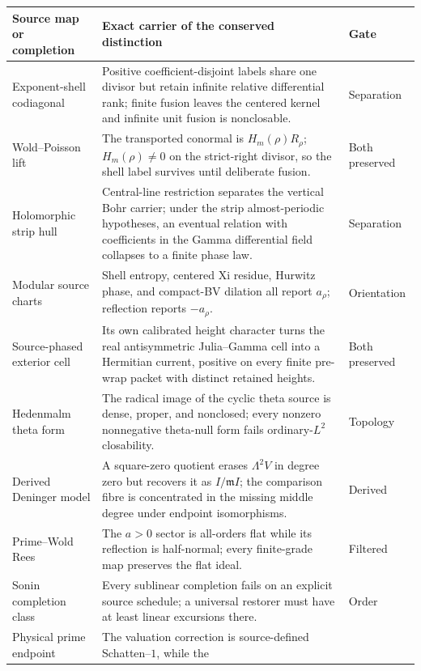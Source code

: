 \documentclass[11pt]{article}
\theoremstyle{definition}
\theoremstyle{remark}
\begin{document}
\begin{table}[ht]
\centering
\footnotesize
\begin{tabular}{@{}>{\raggedright\arraybackslash}p{}
  >{\raggedright\arraybackslash}p{}
  >{\raggedright\arraybackslash}p{}@{}}
\toprule
Source map or completion & Exact carrier of the conserved distinction & Gate\\
\midrule
Exponent-shell codiagonal & Positive coefficient-disjoint labels share one divisor but retain
infinite relative differential rank; finite fusion leaves the centered kernel and infinite unit
fusion is nonclosable. & Separation\\
Wold--Poisson lift & The transported conormal is $H_m(\rho)R_\rho$; $H_m(\rho)\ne0$ on the
strict-right divisor, so the shell label survives until deliberate fusion. & Both preserved\\
Holomorphic strip hull & Central-line restriction separates the vertical Bohr carrier; under the
strip almost-periodic hypotheses, an eventual relation with coefficients in the Gamma
differential field collapses to a finite phase law. & Separation\\
Modular source charts & Shell entropy, centered Xi residue, Hurwitz phase, and compact-BV dilation
all report $a_\rho$; reflection reports $-a_\rho$. & Orientation\\
Source-phased exterior cell & Its own calibrated height character turns the real antisymmetric
Julia--Gamma cell into a Hermitian current, positive on every finite pre-wrap packet with distinct
retained heights. & Both preserved\\
Hedenmalm theta form & The radical image of the cyclic theta source is dense, proper, and
nonclosed; every nonzero nonnegative theta-null form fails ordinary-$L^2$ closability. &
Topology\\
Derived Deninger model & A square-zero quotient erases $\Lambda^2V$ in degree zero but
recovers it as $I/\mathfrak mI$; the comparison fibre is concentrated in the missing middle
degree under endpoint isomorphisms. & Derived\\
Prime--Wold Rees & The $a>0$ sector is all-orders flat while its reflection is
half-normal; every finite-grade map preserves the flat ideal. & Filtered\\
Sonin completion class & Every sublinear completion fails on an explicit source schedule; a
universal restorer must have at least linear excursions there. & Order\\
Physical prime endpoint & The valuation correction is source-defined Schatten--$1$, while the

\end{tabular}
\end{table}
\end{document}
